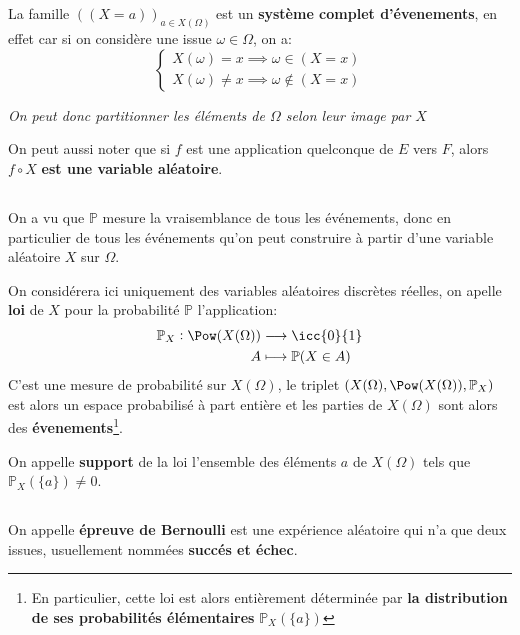 \subsection*{}
La famille \(((X = a))_{a \in X(\Omega)}\) est un \textbf{système complet d'évenements}, en effet car si on considère une issue \(\omega \in \Omega\), on a:
\[
   \begin{cases}
      X(\omega) = x \implies \omega \in (X = x)\\  
      X(\omega) \neq x \implies \omega \notin (X = x)   
   \end{cases} 
\]
\begin{center}
   \textit{On peut donc partitionner les éléments de \(\Omega\) selon leur image par \(X\)}
\end{center}
On peut aussi noter que si \(f\) est une application quelconque de \(E\) vers \(F\), alors \(f \circ X\) \textbf{est une variable aléatoire}.
\pagebreak

\subsection*{}
On a vu que \(\mathbb{P}\) mesure la vraisemblance de tous les événements, donc en particulier de tous les événements qu'on peut construire à partir d'une variable aléatoire \(X\) sur \(\Omega\).\<

On considérera ici uniquement des variables aléatoires discrètes réelles, on apelle \textbf{loi} de \(X\) pour la probabilité \(\mathbb{P}\) l'application:
\[
   \begin{aligned}
      \mathbb{P}_X: \Pow(X(\Omega)) &\longrightarrow \icc{0}{1}\\
      A &\longmapsto \mathbb{P}(X \in A)
   \end{aligned}
\]
C'est une mesure de probabilité sur \(X(\Omega)\), le triplet \((X(\Omega), \Pow(X(\Omega)), \mathbb{P}_X)\) est alors un espace probabilisé à part entière et les parties de \(X(\Omega)\) sont alors des \textbf{évenements}\footnote[1]{En particulier, cette loi est alors entièrement déterminée par \textbf{la distribution de ses probabilités élémentaires} \(\mathbb{P}_X(\{a\})\)}.\<


On appelle \textbf{support} de la loi l'ensemble des éléments \(a\) de \(X(\Omega)\) tels que  \(\mathbb{P}_X(\{a\}) \neq 0\).\+

\subsection*{}
On appelle \textbf{épreuve de Bernoulli} est une expérience aléatoire qui n'a que deux issues, usuellement nommées \textbf{succés et échec}.\<


